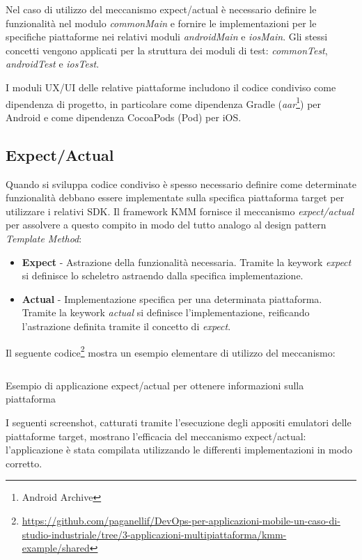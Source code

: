 Nel caso di utilizzo del meccanismo expect/actual è necessario definire le funzionalità nel modulo \textit{commonMain} e fornire le implementazioni per le specifiche piattaforme nei relativi moduli \textit{androidMain} e \textit{iosMain}. Gli stessi concetti vengono applicati per la struttura dei moduli di test: \textit{commonTest}, \textit{androidTest} e \textit{iosTest}.

I moduli UX/UI delle relative piattaforme includono il codice condiviso come dipendenza di progetto, in particolare come dipendenza Gradle (\textit{aar}\footnote{Android Archive}) per Android e come dipendenza CocoaPods (Pod) per iOS.

\subsection{Expect/Actual}
Quando si sviluppa codice condiviso è spesso necessario definire come determinate funzionalità debbano essere implementate sulla specifica piattaforma target per utilizzare i relativi SDK. Il framework KMM fornisce il meccanismo \textit{expect/actual} per assolvere a questo compito in modo del tutto analogo al design pattern \textit{Template Method}:
\begin{itemize}
    \item \textbf{Expect} - Astrazione della funzionalità necessaria. Tramite la keywork \textit{expect} si definisce lo scheletro astraendo dalla specifica implementazione.
    \item \textbf{Actual} - Implementazione specifica per una determinata piattaforma. Tramite la keywork \textit{actual} si definisce l'implementazione, reificando l'astrazione definita tramite il concetto di \textit{expect}.
\end{itemize}

Il seguente codice\footnote{\href{https://github.com/paganellif/DevOps-per-applicazioni-mobile-un-caso-di-studio-industriale/tree/3-applicazioni-multipiattaforma/kmm-example/shared}{https://github.com/paganellif/DevOps-per-applicazioni-mobile-un-caso-di-studio-industriale/tree/3-applicazioni-multipiattaforma/kmm-example/shared}} mostra un esempio elementare di utilizzo del meccanismo:

\begin{listing}[H]
    \inputminted{kotlin}{code/expect-actual.kt}
    \caption{Esempio di applicazione expect/actual per ottenere informazioni sulla piattaforma}
\end{listing}

I seguenti screenshot, catturati tramite l'esecuzione degli appositi emulatori delle piattaforme target, mostrano l'efficacia del meccanismo expect/actual: l'applicazione è stata compilata utilizzando le differenti implementazioni in modo corretto.

